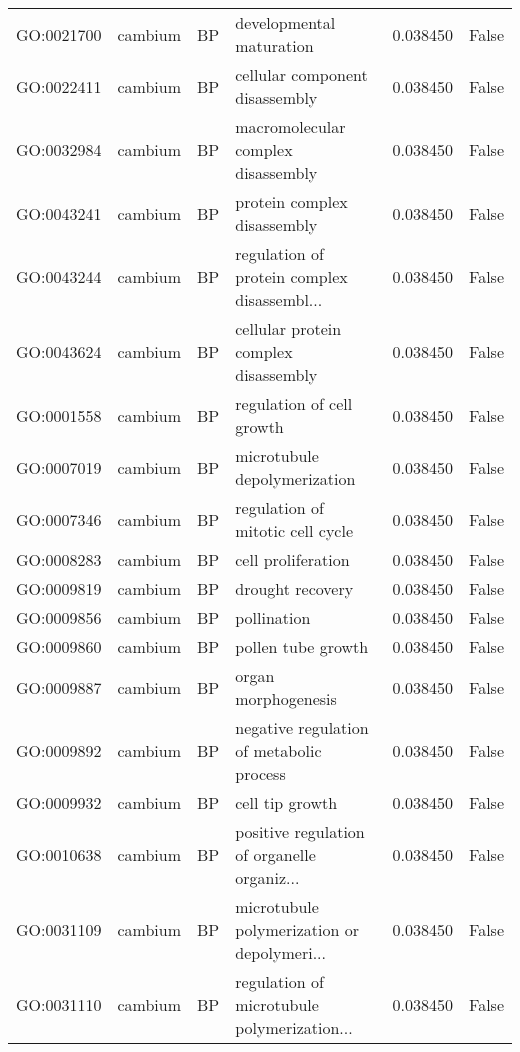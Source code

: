 \begin{longtable}{llllrl}
GO:0021700 & cambium & BP &                      developmental maturation  & 0.038450 &   False \\
GO:0022411 & cambium & BP &                cellular component disassembly  & 0.038450 &   False \\
GO:0032984 & cambium & BP &            macromolecular complex disassembly  & 0.038450 &   False \\
GO:0043241 & cambium & BP &                   protein complex disassembly  & 0.038450 &   False \\
GO:0043244 & cambium & BP &   regulation of protein complex disassembl...  & 0.038450 &   False \\
GO:0043624 & cambium & BP &          cellular protein complex disassembly  & 0.038450 &   False \\
GO:0001558 & cambium & BP &                     regulation of cell growth  & 0.038450 &   False \\
GO:0007019 & cambium & BP &                  microtubule depolymerization  & 0.038450 &   False \\
GO:0007346 & cambium & BP &              regulation of mitotic cell cycle  & 0.038450 &   False \\
GO:0008283 & cambium & BP &                            cell proliferation  & 0.038450 &   False \\
GO:0009819 & cambium & BP &                              drought recovery  & 0.038450 &   False \\
GO:0009856 & cambium & BP &                                   pollination  & 0.038450 &   False \\
GO:0009860 & cambium & BP &                            pollen tube growth  & 0.038450 &   False \\
GO:0009887 & cambium & BP &                           organ morphogenesis  & 0.038450 &   False \\
GO:0009892 & cambium & BP &      negative regulation of metabolic process  & 0.038450 &   False \\
GO:0009932 & cambium & BP &                               cell tip growth  & 0.038450 &   False \\
GO:0010638 & cambium & BP &   positive regulation of organelle organiz...  & 0.038450 &   False \\
GO:0031109 & cambium & BP &   microtubule polymerization or depolymeri...  & 0.038450 &   False \\
GO:0031110 & cambium & BP &   regulation of microtubule polymerization...  & 0.038450 &   False \\

\end{longtable}
